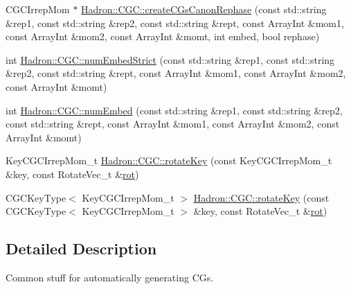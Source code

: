 \begin{DoxyCompactItemize}
\item 
C\+G\+C\+Irrep\+Mom $\ast$ \mbox{\hyperlink{namespaceHadron_1_1CGC_a47b736ab1ac22edb39f4b0df589a7053}{Hadron\+::\+C\+G\+C\+::create\+C\+Gs\+Canon\+Rephase}} (const std\+::string \&rep1, const std\+::string \&rep2, const std\+::string \&rept, const Array\+Int \&mom1, const Array\+Int \&mom2, const Array\+Int \&momt, int embed, bool rephase)
\item 
int \mbox{\hyperlink{namespaceHadron_1_1CGC_af5aac6c0d70eb7159aa635525bac7629}{Hadron\+::\+C\+G\+C\+::num\+Embed\+Strict}} (const std\+::string \&rep1, const std\+::string \&rep2, const std\+::string \&rept, const Array\+Int \&mom1, const Array\+Int \&mom2, const Array\+Int \&momt)
\item 
int \mbox{\hyperlink{namespaceHadron_1_1CGC_af727ac6be27b471bc40b4696c2a29cdb}{Hadron\+::\+C\+G\+C\+::num\+Embed}} (const std\+::string \&rep1, const std\+::string \&rep2, const std\+::string \&rept, const Array\+Int \&mom1, const Array\+Int \&mom2, const Array\+Int \&momt)
\item 
Key\+C\+G\+C\+Irrep\+Mom\+\_\+t \mbox{\hyperlink{namespaceHadron_1_1CGC_acdc26e4dd88e281dc6675da8d6d1b13d}{Hadron\+::\+C\+G\+C\+::rotate\+Key}} (const Key\+C\+G\+C\+Irrep\+Mom\+\_\+t \&key, const Rotate\+Vec\+\_\+t \&\mbox{\hyperlink{rot__mat_8cc_a1db2ab3d82c6029ee441423308802a74}{rot}})
\item 
C\+G\+C\+Key\+Type$<$ Key\+C\+G\+C\+Irrep\+Mom\+\_\+t $>$ \mbox{\hyperlink{namespaceHadron_1_1CGC_ad5f1f6f8b8dd82238f3efeb03d1dc6e5}{Hadron\+::\+C\+G\+C\+::rotate\+Key}} (const C\+G\+C\+Key\+Type$<$ Key\+C\+G\+C\+Irrep\+Mom\+\_\+t $>$ \&key, const Rotate\+Vec\+\_\+t \&\mbox{\hyperlink{rot__mat_8cc_a1db2ab3d82c6029ee441423308802a74}{rot}})
\end{DoxyCompactItemize}


\subsection{Detailed Description}
Common stuff for automatically generating C\+Gs. 

